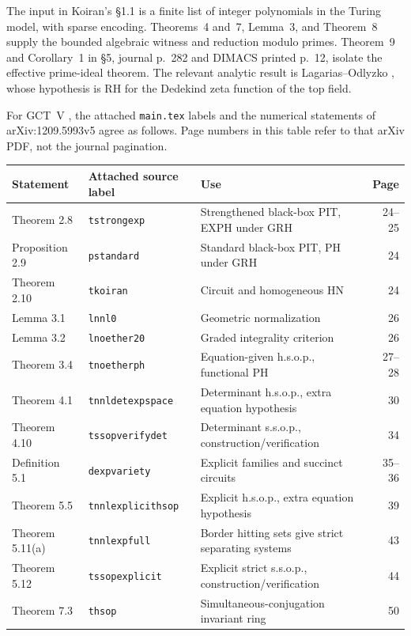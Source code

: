 The input in Koiran's \S1.1 is a finite list of integer polynomials in
the Turing model, with sparse encoding. Theorems~4 and~7, Lemma~3, and
Theorem~8 supply the bounded algebraic witness and reduction modulo
primes. Theorem~9 and Corollary~1 in \S5, journal p.~282 and DIMACS
printed p.~12, isolate the effective prime-ideal theorem. The relevant
analytic result is Lagarias--Odlyzko \cite[Theorem~1.1]{LO77}, whose
hypothesis is RH for the Dedekind zeta function of the top field.

For GCT~V \cite{GCT5}, the attached \texttt{main.tex} labels and the
numerical statements of arXiv:1209.5993v5 agree as follows. Page numbers
in this table refer to that arXiv PDF, not the journal pagination.

\begin{center}
\small
\begin{tabular}{@{}p{.14\linewidth}p{.25\linewidth}p{.43\linewidth}r@{}}
\hline
Statement & Attached source label & Use & Page \\
\hline
Theorem 2.8 & \texttt{tstrongexp} & Strengthened black-box PIT, EXPH under GRH & 24--25 \\
Proposition 2.9 & \texttt{pstandard} & Standard black-box PIT, PH under GRH & 24 \\
Theorem 2.10 & \texttt{tkoiran} & Circuit and homogeneous HN & 24 \\
Lemma 3.1 & \texttt{lnnl0} & Geometric normalization & 26 \\
Lemma 3.2 & \texttt{lnoether20} & Graded integrality criterion & 26 \\
Theorem 3.4 & \texttt{tnoetherph} & Equation-given h.s.o.p., functional PH & 27--28 \\
Theorem 4.1 & \texttt{tnnldetexpspace} & Determinant h.s.o.p., extra equation hypothesis & 30 \\
Theorem 4.10 & \texttt{tssopverifydet} & Determinant s.s.o.p., construction/verification & 34 \\
Definition 5.1 & \texttt{dexpvariety} & Explicit families and succinct circuits & 35--36 \\
Theorem 5.5 & \texttt{tnnlexplicithsop} & Explicit h.s.o.p., extra equation hypothesis & 39 \\
Theorem 5.11(a) & \texttt{tnnlexpfull} & Border hitting sets give strict separating systems & 43 \\
Theorem 5.12 & \texttt{tssopexplicit} & Explicit strict s.s.o.p., construction/verification & 44 \\
Theorem 7.3 & \texttt{thsop} & Simultaneous-conjugation invariant ring & 50 \\
\hline
\end{tabular}
\end{center}

